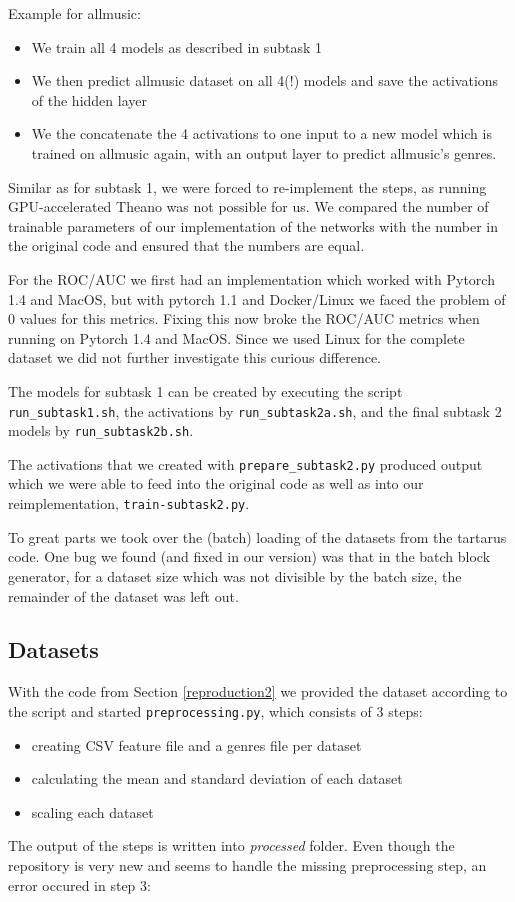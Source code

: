 \documentclass[sigconf,nonacm]{acmart}
\begin{document}
Example for allmusic: 
\begin{itemize}
  \item We train all 4 models as described in subtask 1
  \item We then predict allmusic dataset on all 4(!) models and save the activations of the hidden layer
  \item We the concatenate the 4 activations to one input
  to a new model which is trained on allmusic again, with an
  output layer to predict allmusic's genres.
\end{itemize}

Similar as for subtask 1, we were forced to re-implement the steps,
as running GPU-accelerated Theano was not possible for us.
We compared the number of trainable parameters of our implementation
of the networks with the number in the original code and ensured
that the numbers are equal.

For the ROC/AUC we first had an implementation which worked with
Pytorch 1.4 and MacOS, but with pytorch 1.1 and Docker/Linux
we faced the problem of 0 values for this metrics.
Fixing this now broke the ROC/AUC metrics when running on
Pytorch 1.4 and MacOS.
Since we used Linux for the complete dataset we did not further
investigate this curious difference.

The models for subtask 1 can be created by executing
the script
\texttt{run\_subtask1.sh},
the activations by 
\texttt{run\_subtask2a.sh}, and the final subtask 2
models by \texttt{run\_subtask2b.sh}.

The activations that we created with \texttt{prepare\_subtask2.py}
produced output which we were able to feed into the
original code as well as into our reimplementation, \texttt{train-subtask2.py}.

To great parts we took over the (batch) loading of the datasets from the tartarus code.
One bug we found (and fixed in our version) was that in the batch block generator, for a dataset size 
which was not divisible by the batch size, the remainder of the dataset was left out.

\subsection{Datasets}

With the code from Section \ref{reproduction2} we provided the dataset
according to the script and started \texttt{preprocessing.py},
which consists of 3 steps:
\begin{itemize}
  \item creating CSV feature file and a genres file per dataset
  \item calculating the mean and standard deviation of each dataset
  \item scaling each dataset
\end{itemize}
The output of the steps is written into \textit{processed} folder.
Even though the repository is very new and seems to handle the missing preprocessing step, an error occured in step 3:
\end{document}
